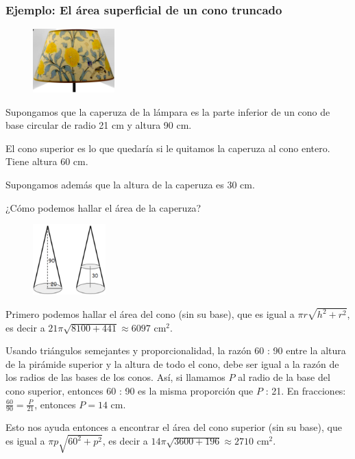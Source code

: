 \documentclass[12pt,a4paper]{article}
\begin{document}
\subsubsection*{Ejemplo: El área superficial de un cono truncado}

\begin{figure}
\centering
\includegraphics[width=0.28\textwidth]{Figuras/fig22.png}
\end{figure}

Supongamos que la caperuza de la lámpara es la parte inferior de un cono de base circular de radio 21 cm y altura 90 cm.

El cono superior es lo que quedaría si le quitamos la caperuza al cono entero. Tiene altura 60 cm.

Supongamos además que la altura de la caperuza es 30 cm.

¿Cómo podemos hallar el área de la caperuza?

\begin{figure}
\centering
\includegraphics[width=0.25\textwidth]{Figuras/fig74.png}
\end{figure}

Primero podemos hallar el área del cono (sin su base), que es igual a $\pi r\sqrt{h^2 + r^2}$, es decir a $21\pi\sqrt{8100 + 441} \approx 6097$ cm$^2$.

Usando triángulos semejantes y proporcionalidad, la razón 60 : 90 entre la altura de la pirámide superior y la altura de todo el cono, debe ser igual a la razón de los radios de las bases de los conos. Así, si llamamos $P$ al radio de la base del cono superior, entonces 60 : 90 es la misma proporción que $P$ : 21. En fracciones: $\frac{60}{90} = \frac{P}{21}$, entonces $P = 14$ cm.

Esto nos ayuda entonces a encontrar el área del cono superior (sin su base), que es igual a $\pi p\sqrt{60^2 + p^2}$, es decir a $14\pi\sqrt{3600 + 196} \approx 2710$ cm$^2$.
\end{document}
